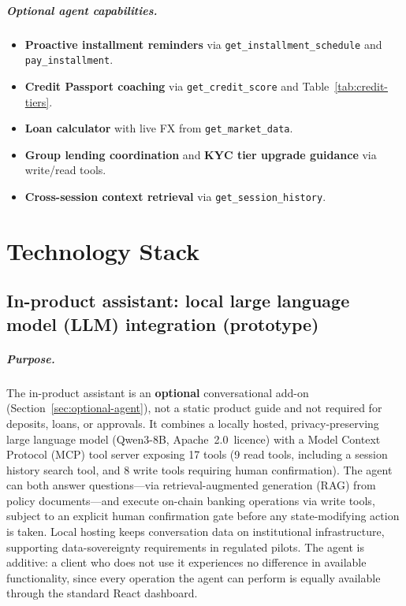 \documentclass[12pt, a4paper]{report}
\begin{document}
\paragraph{Optional agent capabilities.}
\begin{itemize}[noitemsep]
\item \textbf{Proactive installment reminders} via \texttt{get\_installment\_schedule} and \texttt{pay\_installment}.
\item \textbf{Credit Passport coaching} via \texttt{get\_credit\_score} and Table~\ref{tab:credit-tiers}.
\item \textbf{Loan calculator} with live FX from \texttt{get\_market\_data}.
\item \textbf{Group lending coordination} and \textbf{KYC tier upgrade guidance} via write/read tools.
\item \textbf{Cross-session context retrieval} via \texttt{get\_session\_history}.
\end{itemize}

\chapter{Technology Stack}

\section{In-product assistant: local large language model (LLM) integration (prototype)}

\paragraph{Purpose.}
The in-product assistant is an \textbf{optional} conversational add-on (Section~\ref{sec:optional-agent}), not a static product guide and not required for deposits, loans, or approvals. It combines a locally hosted, privacy-preserving large language model (Qwen3-8B, Apache~2.0~licence) with a Model Context Protocol (MCP) tool server exposing 17 tools (9 read tools, including a session history search tool, and 8 write tools requiring human confirmation). The agent can both answer questions---via retrieval-augmented generation (RAG) from policy documents---and execute on-chain banking operations via write tools, subject to an explicit human confirmation gate before any state-modifying action is taken. Local hosting keeps conversation data on institutional infrastructure, supporting data-sovereignty requirements in regulated pilots. The agent is additive: a client who does not use it experiences no difference in available functionality, since every operation the agent can perform is equally available through the standard React dashboard.
\end{document}
